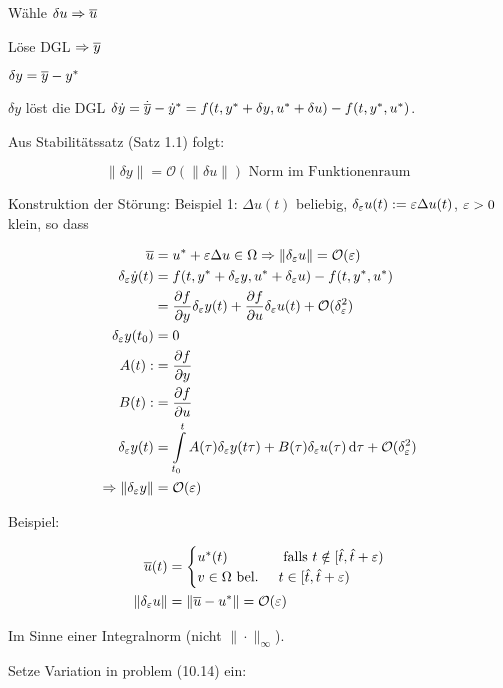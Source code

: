 \bitm
\item Wähle $\delta u \Rightarrow \overline u$
\item Löse DGL $\Rightarrow \overline y$
\item $\delta y = \overline y - y^*$
\eitm

$\delta y$ löst die DGL $\delta \dot y = \dot{\overline y} - \dot y^* = f(t,y^* + \delta y, u^* + \delta u) - f(t,y^*,u^*)$.

Aus Stabilitätssatz (Satz 1.1) folgt:

\[ \|\delta y\| = \mathcal O(\|\delta u\|) \text{ Norm im Funktionenraum } \]

Konstruktion der Störung: Beispiel 1: $\Delta u(t)$ beliebig, $\delta_\varepsilon u(t) := \varepsilon \Delta u(t)$, $\varepsilon > 0$ klein, so dass

\begin{align*}
\overline u &= u^* + \varepsilon \Delta u \in \Omega \Rightarrow \|\delta_\varepsilon u \| = \mathcal O(\varepsilon) \\
\delta_\varepsilon \dot y(t) &= f(t,y^* + \delta_\varepsilon y, u^* + \delta_\varepsilon u) - f(t,y^*, u^*) \\
&= \frac{\partial f}{\partial y} \delta_\varepsilon y(t) + \frac{\partial f}{\partial u} \delta_\varepsilon u(t) + \mathcal O(\delta_\varepsilon^2) \\
\delta_\varepsilon y(t_0) &= 0 \\
A(t) :&= \frac{\partial f}{\partial y} \\
B(t) :&= \frac{\partial f}{\partial u} \\
\delta_\varepsilon y(t) &= \int\limits_{t_0}^t A(\tau) \delta_\varepsilon y(t\tau) + B(\tau) \delta_\varepsilon u(\tau) \,\mathrm d \tau + \mathcal O(\delta_\varepsilon^2) \\
\Rightarrow \|\delta_\varepsilon y\| &= \mathcal O(\varepsilon) \\
\end{align*}

Beispiel:

\begin{align*}
\overline u(t) &= \begin{cases} u^*(t) & \text{ falls } t \notin [\hat t, \hat t + \varepsilon) \\ v \in \Omega \text{ bel. } & t \in [\hat t, \hat t + \varepsilon) \end{cases} \\
\|\delta_\varepsilon u\| &= \|\overline u - u^*\| = \mathcal O(\varepsilon) \\
\end{align*}

Im Sinne einer Integralnorm (nicht $\|\cdot\|_\infty$).

Setze Variation in problem (10.14) ein:

